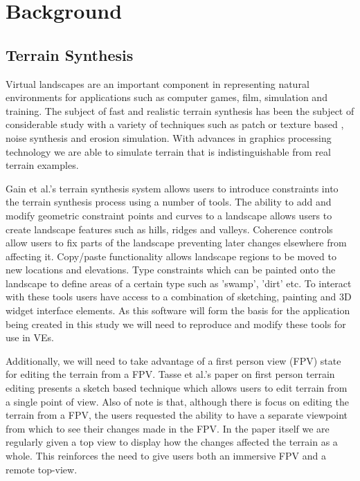 \documentclass{sig-alternate-05-2015}
\begin{document}
\section{Background}
\subsection{Terrain Synthesis} 
Virtual landscapes are an important component in representing natural environments for applications such as computer games, film, simulation and training\cite{Gain2015}. The subject of fast and realistic terrain synthesis has been the subject of considerable study with a variety of techniques such as patch or texture based \cite{Cruz2015, Tasse2012}, noise synthesis\cite{Musgrave1989} and erosion simulation\cite{Anh2007}. With advances in graphics processing technology we are able to simulate terrain that is indistinguishable from real terrain examples\cite{Gain2015}. 

 Gain et al.'s terrain synthesis system allows users to introduce constraints into the terrain synthesis process using a number of tools\cite{Gain2015}. The ability to add and modify geometric constraint points and curves to a landscape allows users to create landscape features such as hills, ridges and valleys.  Coherence controls allow users to fix parts of the landscape preventing later changes elsewhere from affecting it. Copy/paste functionality allows landscape regions to be moved to new locations and elevations. Type constraints which can be painted onto the landscape to define areas of a certain type such as 'swamp', 'dirt' etc. To interact with these tools users have access to a combination of sketching, painting and 3D widget interface elements. As this software will form the basis for the application being created in this study we will need to reproduce and modify these tools for use in VEs.

Additionally, we will need to take advantage of a first person view (FPV) state for editing the terrain from a FPV. Tasse et al.'s paper on first person terrain editing presents a sketch based technique which allows users to  edit terrain from a single point of view\cite{Tasse2014}. Also of note is that, although there is focus on editing the terrain from a FPV, the users requested the ability to have a separate viewpoint from which to see their changes made in the FPV. In the paper itself we are regularly given a top view to display how the changes affected the terrain as a whole. This reinforces the need to give users both an immersive FPV and a remote top-view.
\end{document}
